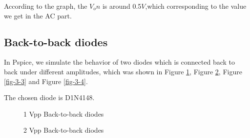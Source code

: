 \documentclass{article}
\begin{document}
\newpage
According to the graph, the $V_on$ is around 0.5$V$,which corresponding to the value we get in the AC part.

\subsection{Back-to-back diodes}

In Pspice, we simulate the behavior of two diodes which is connected back to back under different amplitudes, which was shown in Figure \ref{fig-3-1}, Figure \ref{fig-3-2}, Figure \ref{fig-3-3} and Figure \ref{fig-3-4}.

The chosen diode is D1N4148.

\begin{figure}[!htbp]
	\centering
	\caption{1 Vpp Back-to-back diodes}
	\label{fig-3-1}
\end{figure}

\begin{figure}[!htbp]
	\centering
	\caption{2 Vpp Back-to-back diodes}
	\label{fig-3-2}
\end{figure}
\end{document}
